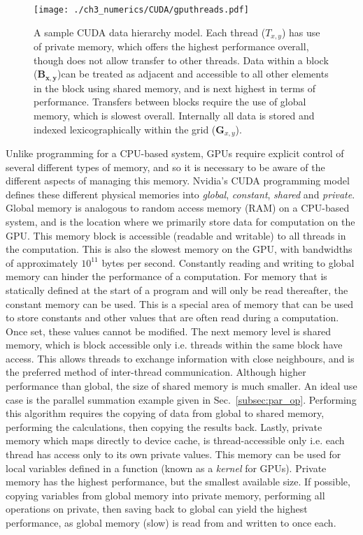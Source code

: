 \begin{figure}[tb]
    \centering
    \texttt{[image: ./ch3\_numerics/CUDA/gputhreads.pdf]}
    \caption{A sample CUDA data hierarchy model. Each thread ($T_{x,y}$) has use of private memory, which offers the highest performance overall, though does not allow transfer to other threads. Data within a block ($\mathbf{B_{x,y}}$)can be treated as adjacent and accessible to all other elements in the block using {shared memory}, and is next highest in terms of performance. Transfers between blocks require the use of {global memory}, which is slowest overall. Internally all data is stored and indexed lexicographically within the grid ($\mathbf{G}_{x,y}$).}
    \label{fig:gpu_threads}
\end{figure}

Unlike programming for a CPU-based system, GPUs require explicit control of several different types of memory, and so it is necessary to be aware of the different aspects of managing this memory. Nvidia's CUDA programming model defines these different physical memories into \textit{global}, \textit{constant}, \textit{shared} and \textit{private}. Global memory is analogous to random access memory (RAM) on a CPU-based system, and is the location where we primarily store data for computation on the GPU. This memory block is accessible (readable and writable) to all threads in the computation. This is also the slowest memory on the GPU, with bandwidths of approximately $10^{11}$ bytes per second. Constantly reading and writing to global memory can hinder the performance of a computation. For memory that is statically defined at the start of a program and will only be read thereafter, the constant memory can be used. This is a special area of memory that can be used to store constants and other values that are often read during a computation. Once set, these values cannot be modified. The next memory level is shared memory, which is block accessible only i.e. threads within the same block have access. This allows threads to exchange information with close neighbours, and is the preferred method of inter-thread communication. Although higher performance than global, the size of shared memory is much smaller. An ideal use case is the parallel summation example given in Sec.~\ref{subsec:par_op}. Performing this algorithm requires the copying of data from global to shared memory, performing the calculations, then copying the results back. Lastly, private memory which maps directly to device cache, is thread-accessible only i.e. each thread has access only to its own private values. This memory can be used for local variables defined in a function (known as a \textit{kernel} for GPUs). Private memory has the highest performance, but the smallest available size. If possible, copying variables from global memory into private memory, performing all operations on private, then saving back to global can yield the highest performance, as global memory (slow) is read from and written to once each.

